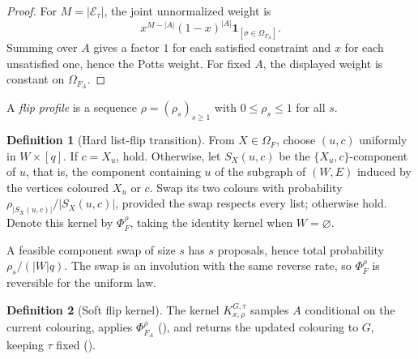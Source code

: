 \documentclass[11pt,reqno]{article}
\theoremstyle{plain}
\theoremstyle{definition}
\newtheorem{definition}[theorem]{Definition}
\theoremstyle{remark}
\theoremstyle{definition}
\newtheorem{definition}[definition]{Definition}
\theoremstyle{remark}
\newcommand{\one}[1]{\mathbf{1}_{\left[#1\right]}}   %
\newcommand{\colours}{[q]}                        %
\begin{document}
\begin{proof}
For \(M=|\mathcal E_\tau|\), the joint unnormalized weight is
\begin{equation}\label{eq:joint-active-law}
  x^{M-|A|}(1-x)^{|A|}\one{\sigma\in\Omega_{F_A}}.
\end{equation}
Summing over \(A\) gives a factor \(1\) for each satisfied constraint
and \(x\) for each unsatisfied one, hence the Potts weight.  For fixed
\(A\), the displayed weight is constant on \(\Omega_{F_A}\).
\end{proof}

A \emph{flip profile} is a sequence \(\rho=(\rho_s)_{s\ge1}\) with
\(0\le\rho_s\le1\) for all \(s\).

\begin{definition}[Hard list-flip transition]\label{def:flip}
From \(X\in\Omega_F\), choose \((u,c)\) uniformly in \(W\times\colours\).
If \(c=X_u\), hold.  Otherwise, let \(S_X(u,c)\) be the
\(\{X_u,c\}\)-component of \(u\), that is, the component containing \(u\)
of the subgraph of \((W,E)\) induced by the vertices coloured \(X_u\) or
\(c\).  Swap its two colours with probability
\(\rho_{|S_X(u,c)|}/|S_X(u,c)|\), provided the swap respects every list;
otherwise hold.  Denote this kernel by \(\Phi_F^\rho\), taking the
identity kernel when \(W=\varnothing\).
\end{definition}

A feasible component swap of size \(s\) has \(s\) proposals, hence total
probability \(\rho_s/(|W|q)\).  The swap is an involution with the same
reverse rate, so \(\Phi_F^\rho\) is reversible for the uniform law.

\begin{definition}[Soft flip kernel]\label{def:soft-kernel}
The kernel \(K_{x,\rho}^{G,\tau}\) samples \(A\) conditional on the
current colouring, applies \(\Phi_{F_A}^\rho\) (), and
returns the updated
colouring to \(G\), keeping \(\tau\) fixed ().
\end{definition}
\end{document}
